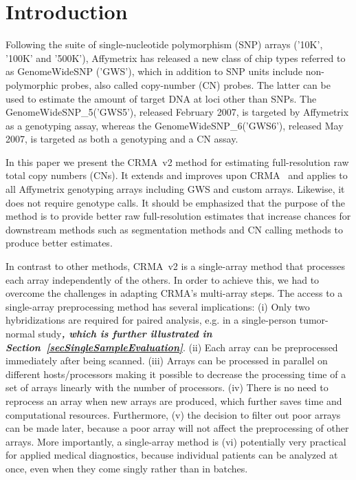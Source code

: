 \documentclass{bioinfo}
\newcommand{\GWS}{GWS\xspace}
\newcommand{\GWSFive}{GWS5\xspace}
\newcommand{\GWSSix}{GWS6\xspace}
\newcommand{\GWSFivef}{GenomeWideSNP\_5\xspace}
\newcommand{\GWSSixf}{GenomeWideSNP\_6\xspace}
\newcommand{\updated}[3][red]{{{\color{#1}\textsl{\textbf{#2}}}\endnote{#3 \textsl{#2}}}\xspace}
\begin{document}
\section{Introduction}
\label{secBackground}
Following the suite of single-nucleotide polymorphism (SNP) arrays ('10K', '100K' and '500K'), Affymetrix has released a new class of chip types referred to as GenomeWideSNP ('GWS'), which in addition to SNP units include non-polymorphic probes, also called copy-number (CN) probes.  The latter can be used to estimate the amount of target DNA at loci other than SNPs.  The \GWSFivef ('\GWSFive'), released February 2007, is targeted by Affymetrix as a genotyping assay, whereas the \GWSSixf ('\GWSSix'), released May 2007, is targeted as both a genotyping and a CN assay.

In this paper we present the CRMA~v2 method for estimating full-resolution raw total copy numbers (CNs).  It extends and improves upon CRMA~\citep{BengtssonH_etal_2008} and applies to all Affymetrix genotyping arrays including \GWS and custom arrays. Likewise, it does not require genotype calls.  
It should be emphasized that the purpose of the method is to provide better raw full-resolution estimates that increase chances for downstream methods such as segmentation methods and CN calling methods to produce better estimates.

In contrast to other methods, CRMA~v2 is a single-array method that processes each array independently of the others.  In order to achieve this, we had to overcome the challenges in adapting CRMA's multi-array steps.
The access to a single-array preprocessing method has several implications: (i) Only two hybridizations are required for paired analysis, e.g. in a single-person tumor-normal study\updated{, which is further illustrated in Section~\ref{secSingleSampleEvaluation}}{ADDED:}. (ii) Each array can be preprocessed immediately after being scanned.  (iii) Arrays can be processed in parallel on different hosts/processors making it possible to decrease the processing time of a set of arrays linearly with the number of processors.  (iv) There is no need to reprocess an array when new arrays are produced, which further saves time and computational resources.   Furthermore, (v) the decision to filter out poor arrays can be made later, because a poor array will not affect the preprocessing of other arrays. %
More importantly, a single-array method is (vi) potentially very practical for applied medical diagnostics, because individual patients can be analyzed at once, even when they come singly rather than in batches.
\end{document}
